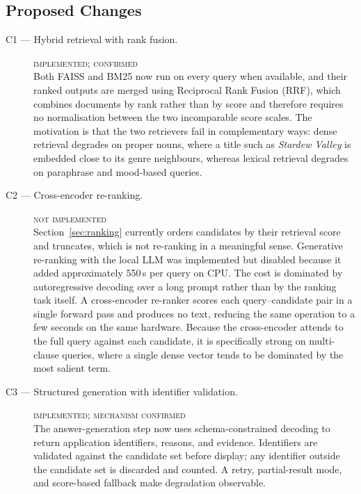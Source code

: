 \subsection{Proposed Changes}
\label{sec:proposed-changes}

\begin{description}

  \item[C1 --- Hybrid retrieval with rank fusion.] \hfill\textsc{implemented; confirmed}\\
  Both FAISS and BM25 now run on every query when available, and
  their ranked outputs are merged using Reciprocal Rank Fusion (RRF), which
  combines documents by rank rather than by score and therefore requires no
  normalisation between the two incomparable score scales. The motivation is
  that the two retrievers fail in complementary ways: dense retrieval degrades
  on proper nouns, where a title such as \emph{Stardew Valley} is embedded close
  to its genre neighbours, whereas lexical retrieval degrades on paraphrase and
  mood-based queries.

  \item[C2 --- Cross-encoder re-ranking.] \hfill\textsc{not implemented}\\
  Section~\ref{sec:ranking} currently orders candidates by their retrieval score
  and truncates, which is not re-ranking in a meaningful sense. Generative
  re-ranking with the local LLM was implemented but disabled because it added
  approximately 550\,s per query on CPU. The cost is dominated by autoregressive
  decoding over a long prompt rather than by the ranking task itself. A
  cross-encoder re-ranker scores each query--candidate pair in a single forward
  pass and produces no text, reducing the same operation to a few seconds on the
  same hardware. Because the cross-encoder attends to the full query against
  each candidate, it is specifically strong on multi-clause queries, where a
  single dense vector tends to be dominated by the most salient term.

  \item[C3 --- Structured generation with identifier validation.] \hfill\textsc{implemented; mechanism confirmed}\\
  The answer-generation step now uses schema-constrained decoding to return
  application identifiers, reasons, and evidence. Identifiers are validated
  against the candidate set before display; any identifier outside the candidate
  set is discarded and counted. A retry, partial-result mode, and score-based
  fallback make degradation observable.


\end{description}
